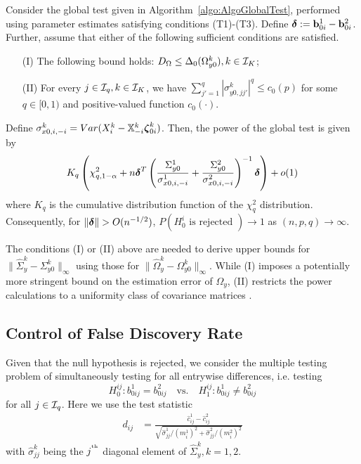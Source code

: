 \begin{Theorem}\label{thm:PowerThm}
Consider the global test given in Algorithm~\ref{algo:AlgoGlobalTest}, performed using parameter estimates satisfying conditions (T1)-(T3). Define ${\boldsymbol{\delta}} := {\bf{b}}_{0 i}^1 - {\bf{b}}_{0 i}^2$. Further, assume that either of the following sufficient conditions are satisfied.

\begin{itemize}
\item[(I)] The following bound holds: $D_\Omega \leq \Delta_0 (\Omega_{y0}^k), k \in {\cal{I}}_K$;

\item[(II)] For every $j \in {\cal{I}}_q, k \in {\cal{I}}_K$, we have
$
\sum_{j' = 1}^q | \sigma_{y0,jj'}^k |^q \leq c_0 (p)
$ for some $q \in [0,1)$ and positive-valued function $c_0(\cdot)$.
\end{itemize}

Define $\sigma_{x0, i,-i}^k = Var (X_i^k - {\mathbb{X}}_{-i}^k {\boldsymbol{\zeta}}_{0i}^k)$. Then, the power of the global test is given by
%
$$
K_q \left( \chi^2_{q,1-\alpha} + n {\boldsymbol{\delta}}^T 
\left( \frac{ \Sigma_{y 0}^1}{\sigma_{x0, i,-i}^1} + \frac{\Sigma_{y 0}^2}{\sigma_{x0, i,-i}^2} \right)^{-1} {\boldsymbol{\delta}} \right) + o(1)
$$
%
where $K_q$ is the cumulative distribution function of the $\chi^2_q$ distribution. Consequently, for $\| {\boldsymbol{\delta}} \| > O(n^{-1/2})$, $P( H_0^i \text{ is rejected }) \rightarrow 1$ as $(n,p,q) \rightarrow \infty$.
\end{Theorem}

The conditions (I) or (II) above are needed to derive upper bounds for $\| \widehat \Sigma_y^k - \Sigma_{y0}^k \|_\infty$ using those for $\| \widehat \Omega_y^k - \Omega_{y0}^k \|_\infty$. While (I) imposes a potentially more stringent bound on the estimation error of $\Omega_y$, (II) restricts the power calculations to a uniformity class of covariance matrices \citep{BickelLevina08,CaiLiuLuo12}.
%

\subsection{Control of False Discovery Rate}
Given that the null hypothesis is rejected, we consider the multiple testing problem of simultaneously testing for all entrywise differences, i.e. testing
%
$$
H_0^{ij}: b_{0 ij}^1 = b_{0ij}^2 \quad \text{vs.} \quad H_1^{ij}: b_{0 ij}^1 \neq b_{0 ij}^2 
$$
%
for all $j \in {\cal{I}}_q$. Here we use the test statistic
%
\begin{align}\label{eqn:PairwiseStatistic}
d_{ij} &= \frac{\widehat c_{ij}^1 - \widehat c_{ij}^2}{\sqrt{\hat \sigma_{jj}^1/ (m_i^1)^2 + \hat \sigma_{jj}^2/ (m_i^2)^2}}
\end{align}
%
with $\hat \sigma_{jj}^k$ being the $j^{\operatorname*{^{\text{th}}}}$ diagonal element of $\widehat \Sigma_y^k, k = 1,2$.

